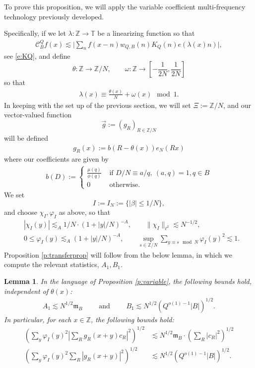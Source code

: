 \documentclass[12pt]{amsart}
\numberwithin{equation}{section}
\newtheorem{lemma}[theorem]{Lemma}
\theoremstyle{definition}
\begin{document}
To prove this proposition, we will apply the variable coefficient multi-frequency technology previously developed.

Specifically, if we let $\lambda : \mathbb{Z} \to \mathbb{T}$ be a linearizing function so that
    \begin{align}
        \mathcal{C}_B^Q f(x) \lesssim \big| \sum_n f(x-n) w_{Q,B}(n) K_Q(n) e(\lambda(x) n) \big|,
    \end{align}
    see \eqref{e:KQ},
and define 
\[ \theta : \mathbb{Z} \to \mathbb{Z}/N, \qquad \omega : \mathbb{Z} \to [-\frac{1}{2N},\frac{1}{2N}] \]
so that
\begin{align}
    \lambda(x) \equiv \frac{\theta(x)}{N} + \omega(x) \mod 1.
\end{align}
In keeping with the set up of the previous section, we will set $\Xi := \mathbb{Z}/N$, and our vector-valued function
\[ \vec{g} := (g_R)_{R \in \mathbb{Z}/N}\]
will be defined
\begin{align}
    g_R(x) := b(R- \theta(x)) e_N(Rx)
\end{align}
where our coefficients are given by
\begin{align}
b(D) := \begin{cases} \frac{\mu(q)}{\phi(q)} & \text{ if } D/N \equiv a/q, \ (a,q) = 1, q \in B \\
    0 & \text{ otherwise}. \end{cases}
\end{align}
We set 
\[ I := I_N:= \{ |\beta| \leq 1/N\},\]
and choose $\chi_I,\varphi_I$ as above, so that
\begin{align}
    &|\chi_I(y)| \lesssim_A 1/N \cdot (1 + |y|/N)^{-A},\qquad \|\chi_I\|_{\ell^2}\lesssim N^{-1/2},\\
    &0 \leq \varphi_I(y) \lesssim_A (1 + |y|/N)^{-A}, \qquad \sup_{s \in \mathbb{Z}/N} \sum_{y \equiv s \mod N} \varphi_I(y)^2 \lesssim 1.
\end{align}
Proposition \ref{p:transferprop} will follow from the below lemma, in which we compute the relevant statistics, $A_1,B_1$.
\begin{lemma}\label{l:A1B1}
    In the language of Proposition \ref{p:variable}, the following bounds hold, independent of $\theta(x)$:
\begin{align}
A_1 \lesssim  N^{1/2} \mathfrak m_B \qquad \text{ and } \qquad 
B_1 \lesssim  N^{1/2} (Q^{o(1)-1} |B|)^{1/2}.
\end{align}
In particular, for each $x \in \mathbb{Z}$, the following bounds hold:
\begin{align}
(\sum_y \varphi_I(y)^2 |\sum_R g_R(x+y) c_R|^2)^{1/2} &\lesssim N^{1/2} \mathfrak m_B \cdot (\sum_R |c_R|^2)^{1/2}  \\
(\sum_y \varphi_I(y)^2 \sum_R |g_R(x+y)|^2 )^{1/2} &\lesssim N^{1/2} (Q^{o(1)-1} |B|)^{1/2}.
\end{align}
\end{lemma}
\end{document}
